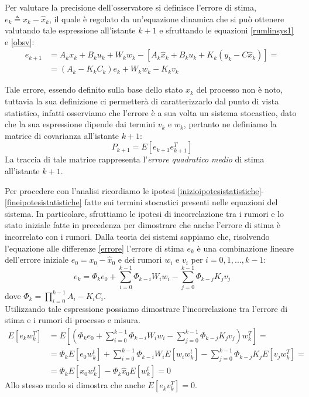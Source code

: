 Per valutare la precisione dell'osservatore si definisce l'errore di stima, \\ $e_k \triangleq x_k-\hat{x}_k$, il quale è regolato da un'equazione dinamica che si può ottenere valutando tale espressione all'istante $k+1$ e sfruttando le equazioni \eqref{rumlinsys1} e \eqref{obsv}:
\begin{equation}
\label{errore}
\begin{split}
e_{k+1}&=A_kx_k+B_ku_k+W_kw_k-[A_k\hat{x}_k+B_ku_k+K_k(y_k-C\hat{x}_k)] = \\
&=(A_k-K_kC_k)e_k+W_kw_k-K_kv_k
\end{split}
\end{equation}

Tale errore, essendo definito sulla base dello stato $x_k$ del processo non è noto, tuttavia la sua definizione ci permetterà di caratterizzarlo dal punto di vista statistico, infatti osserviamo che l'errore è a sua volta un sistema stocastico, dato che la sua espressione dipende dai termini $v_k$ e $w_k$, pertanto ne definiamo la matrice di covarianza all'istante $k+1$:
\begin{equation}
\label{matrcov}
P_{k+1}=E[e_{k+1}e_{k+1}^T]
\end{equation}
La traccia di tale matrice rappresenta l'\textit{errore quadratico medio} di stima all'istante $k+1$.


Per procedere con l'analisi ricordiamo le ipotesi \eqref{inizioipotesistatistiche}-\eqref{fineipotesistatistiche} fatte sui termini stocastici presenti nelle equazioni del sistema.
In particolare, sfruttiamo le ipotesi di incorrelazione tra i rumori e lo stato iniziale fatte in precedenza per dimostrare che anche l'errore di stima è incorrelato con i rumori.
Dalla teoria dei sistemi sappiamo che, risolvendo l'equazione alle differenze \eqref{errore} l'errore di stima $e_k$ è una combinazione lineare dell'errore iniziale $e_0=x_0-\hat{x}_0$ e dei rumori $w_i$ e $v_i$ per $i=0,1,...,k-1$:
\begin{equation}
e_k=\Phi_{k}e_0 + \sum_{i=0}^{k-1}\Phi_{k-i}W_iw_i - \sum_{j=0}^{k-1}\Phi_{k-j}K_jv_j
\end{equation}
dove $\Phi_{k}=\prod_{i=0}^{k-1}A_i-K_iC_i$.\\
Utilizzando tale espressione possiamo dimostrare l'incorrelazione tra l'errore di stima e i rumori di processo e misura.
\begin{equation}
\begin{split}
E[e_kw_k^T]&=E[(\Phi_{k}e_0 + \sum_{i=0}^{k-1}\Phi_{k-i}W_iw_i - \sum_{j=0}^{k-1}\Phi_{k-j}K_jv_j)w_k^T]=\\
&=\Phi_kE[e_0w_k^t] + \sum_{i=0}^{k-1}\Phi_{k-i}W_iE[w_iw_k^t] - \sum_{j=0}^{k-1}\Phi_{k-j}K_jE[v_jw_k^T]=\\
&=\Phi_kE[x_0w_k^t] - \Phi_k\hat{x}_0E[w_k^t] = 0
\end{split}
\end{equation}
Allo stesso modo si dimostra che anche $E[e_kv_k^T]=0$.
\newpage